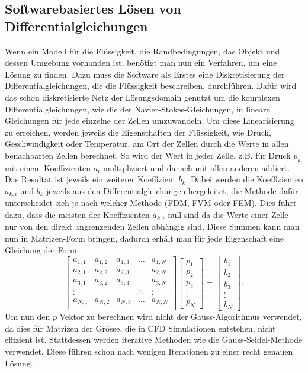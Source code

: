 \subsection{Softwarebasiertes Lösen von Differentialgleichungen}
Wenn ein Modell für die Flüssigkeit, die Randbedingungen, das Objekt und dessen Umgebung vorhanden ist, benötigt man nun ein Verfahren, um eine Lösung zu finden. 
Dazu muss die Software als Erstes eine Diskretisierung der Differentialgleichungen, die die Flüssigkeit beschreiben, durchführen.
Dafür wird das schon diskretisierte Netz der Lösungsdomain genutzt um die komplexen Differentialgleichungen, wie die der Navier-Stokes-Gleichungen, in lineare Gleichungen für jede einzelne der Zellen umzuwandeln.
Um diese Linearisierung zu erreichen, werden jeweils die Eigenschaften der Flüssigkeit, wie Druck, Geschwindigkeit oder Temperatur, am Ort der Zellen durch die Werte in allen benachbarten Zellen berechnet.
So wird der Wert in jeder Zelle, z.B. für Druck $p_{k}$ mit einem Koeffizienten $ a_{i} $ multipliziert und danach mit allen anderen addiert.
Das Resultat ist jeweils ein weiterer Koeffizient $b_{k}$.
Dabei werden die Koeffizienten $a_{k,i}$ und $b_{k }$ jeweils aus den Differentialgleichungen hergeleitet, die Methode dafür unterscheidet sich je nach welcher Methode (FDM, FVM oder FEM).
Dies führt dazu, dass die meisten der Koeffizienten $a_{k,i}$ null sind da die Werte einer Zelle nur von den direkt angrenzenden Zellen abhängig sind.
Diese Summen kann man nun in Matrizen-Form bringen, dadurch erhält man für jede Eigenschaft eine Gleichung der Form
\begin{equation}
\begin{bmatrix}
	a_{1,1} &  a_{1,2} & a_{1,3} & \dots & a_{1,N} \\
	a_{2,1} &  a_{2,2} & a_{2,3} &  & a_{2,N} \\
	a_{3,1} &  a_{3,2} & a_{3,3} &  & a_{3,N} \\
	\vdots & &  & \ddots & \vdots \\
	a_{N,1} &  a_{N,2} & a_{N,3} & \dots & a_{N,N} \\
\end{bmatrix}
\begin{bmatrix}
	p_{1} \\
	p_{2} \\
	p_{3} \\
	\vdots \\
	p_{N}
\end{bmatrix}
= 
\begin{bmatrix}
b_{1} \\
b_{2} \\
b_{3} \\
\vdots \\
b_{N}
\end{bmatrix}
.
\end{equation}
Um nun den $p$ Vektor zu berechnen wird nicht der Gauss-Algorithmus verwendet, da dies für Matrizen der Grösse, die in CFD Simulationen entstehen, nicht effizient ist.
Stattdessen werden iterative Methoden wie die Gauss-Seidel-Methode verwendet.
Diese führen schon nach wenigen Iterationen zu einer recht genauen Lösung.